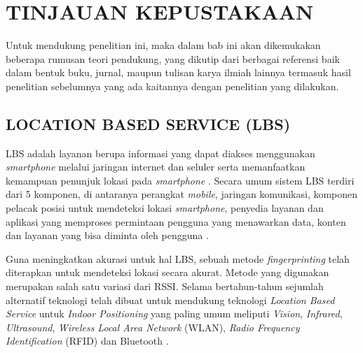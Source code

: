 \fancyhf{} 
\fancyfoot[C]{\thepage}
\chapter{TINJAUAN KEPUSTAKAAN}

\par Untuk mendukung penelitian ini, maka dalam bab ini akan dikemukakan beberapa rumusan teori pendukung, yang dikutip dari berbagai referensi baik dalam bentuk buku, jurnal, maupun tulisan karya ilmiah lainnya termasuk hasil penelitian sebelumnya yang ada kaitannya dengan penelitian yang dilakukan.                

\section{\uppercase{LOCATION BASED SERVICE (LBS)}}
LBS adalah layanan berupa informasi yang dapat diakses menggunakan \textit{smartphone} melalui jaringan internet dan seluler serta memanfaatkan kemampuan penunjuk lokasi pada \textit{smartphone} \citep{Wardhana2010}. Secara umum sistem LBS terdiri dari 5 komponen, di antaranya perangkat \textit{mobile}, jaringan komunikasi, komponen pelacak posisi untuk mendeteksi lokasi \textit{smartphone}, penyedia layanan dan aplikasi yang memproses permintaan pengguna yang menawarkan data, konten dan layanan yang bisa diminta oleh pengguna \citep{Al-Ammar2014}.

\par Guna meningkatkan akurasi untuk hal LBS, sebuah metode \textit{fingerprinting} telah diterapkan untuk mendeteksi lokasi secara akurat. Metode yang digunakan merupakan salah satu variasi dari RSSI. Selama bertahun-tahun sejumlah alternatif teknologi telah dibuat untuk mendukung teknologi \textit{Location Based Service} untuk \textit{Indoor Positioning} yang paling umum meliputi \textit{Vision}, \textit{Infrared}, \textit{Ultrasound}, \textit{Wireless Local Area Network} (WLAN), \textit{Radio Frequency Identification} (RFID) dan Bluetooth \citep{Olszewski2013}.

